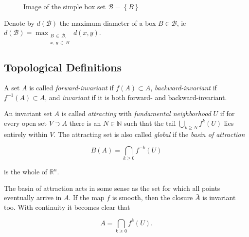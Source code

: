 \begin{figure}[ht]
    \caption{Image of the simple box set $\mathcal{B} = \left\{ B \right\}$}
    \label{fig:boximage}
\end{figure}

\begin{definition}
    Denote by $d(\mathcal{B})$ the maximum diameter of a box $B \in \mathcal{B}$, ie 
    $d(\mathcal{B}) = \max_{\substack{B\, \in\, \mathcal{B},\\ x,\, y\, \in\, B}} d(x, y)$. 
\end{definition}


\subsection{Topological Definitions}

\begin{definition}
    \cite*{algGAIO} A set $A$ is called \emph{forward-invariant} if $f(A) \subset A$, 
    \emph{backward-invariant} if $f^{-1}(A) \subset A$, and \emph{invariant} if it is
    both forward- and backward-invariant.
\end{definition}

\begin{definition}
    \cite*{subalg} An invariant set $A$ is called \emph{attracting} with \emph{fundamental neighborhood}
    $U$ if for every open set $V \supset A$ there is an $N \in \mathbb{N}$ such that the tail 
    $\bigcup_{k \geq N} f^k(U)$ lies entirely within $V$. The attracting 
    set is also called \emph{global} if the \emph{basin of attraction} 
    
    \begin{equation}\label{eq:globattr}
        B(A) = \bigcap\limits_{k \geq 0} f^{-k}(U)
    \end{equation}

    is the whole of $\mathbb{R}^n$.
\end{definition}

The basin of attraction acts in some sense as the set for which all points eventually arrive
in $A$. If the map $f$ is smooth, then the closure $\bar{A}$ is invariant too. With continuity 
it becomes clear that

\begin{equation}
    A = \bigcap\limits_{k \geq 0} f^k(U).
\end{equation}

